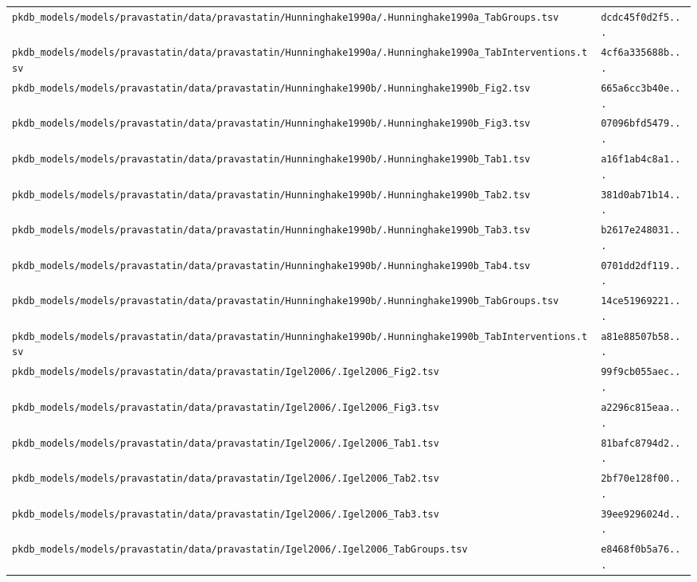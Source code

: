 \documentclass{article}
\begin{document}
\begin{longtable}{ll}
\texttt{pkdb\_models/models/pravastatin/data/pravastatin/Hunninghake1990a/.Hunninghake1990a\_TabGroups.tsv} & \texttt{dcdc45f0d2f5...} \\
\texttt{pkdb\_models/models/pravastatin/data/pravastatin/Hunninghake1990a/.Hunninghake1990a\_TabInterventions.tsv} & \texttt{4cf6a335688b...} \\
\texttt{pkdb\_models/models/pravastatin/data/pravastatin/Hunninghake1990b/.Hunninghake1990b\_Fig2.tsv} & \texttt{665a6cc3b40e...} \\
\texttt{pkdb\_models/models/pravastatin/data/pravastatin/Hunninghake1990b/.Hunninghake1990b\_Fig3.tsv} & \texttt{07096bfd5479...} \\
\texttt{pkdb\_models/models/pravastatin/data/pravastatin/Hunninghake1990b/.Hunninghake1990b\_Tab1.tsv} & \texttt{a16f1ab4c8a1...} \\
\texttt{pkdb\_models/models/pravastatin/data/pravastatin/Hunninghake1990b/.Hunninghake1990b\_Tab2.tsv} & \texttt{381d0ab71b14...} \\
\texttt{pkdb\_models/models/pravastatin/data/pravastatin/Hunninghake1990b/.Hunninghake1990b\_Tab3.tsv} & \texttt{b2617e248031...} \\
\texttt{pkdb\_models/models/pravastatin/data/pravastatin/Hunninghake1990b/.Hunninghake1990b\_Tab4.tsv} & \texttt{0701dd2df119...} \\
\texttt{pkdb\_models/models/pravastatin/data/pravastatin/Hunninghake1990b/.Hunninghake1990b\_TabGroups.tsv} & \texttt{14ce51969221...} \\
\texttt{pkdb\_models/models/pravastatin/data/pravastatin/Hunninghake1990b/.Hunninghake1990b\_TabInterventions.tsv} & \texttt{a81e88507b58...} \\
\texttt{pkdb\_models/models/pravastatin/data/pravastatin/Igel2006/.Igel2006\_Fig2.tsv} & \texttt{99f9cb055aec...} \\
\texttt{pkdb\_models/models/pravastatin/data/pravastatin/Igel2006/.Igel2006\_Fig3.tsv} & \texttt{a2296c815eaa...} \\
\texttt{pkdb\_models/models/pravastatin/data/pravastatin/Igel2006/.Igel2006\_Tab1.tsv} & \texttt{81bafc8794d2...} \\
\texttt{pkdb\_models/models/pravastatin/data/pravastatin/Igel2006/.Igel2006\_Tab2.tsv} & \texttt{2bf70e128f00...} \\
\texttt{pkdb\_models/models/pravastatin/data/pravastatin/Igel2006/.Igel2006\_Tab3.tsv} & \texttt{39ee9296024d...} \\
\texttt{pkdb\_models/models/pravastatin/data/pravastatin/Igel2006/.Igel2006\_TabGroups.tsv} & \texttt{e8468f0b5a76...} \\

\end{longtable}
\end{document}
